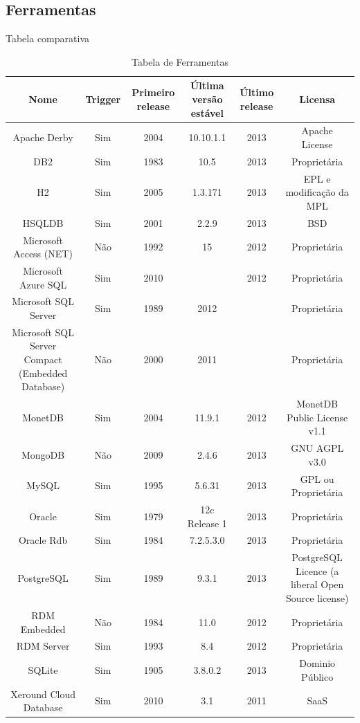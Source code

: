 \documentclass[conference]{IEEEtran}
\begin{document}
  \subsection{Ferramentas}
  Tabela comparativa
  \begin{table}[!t]
    \renewcommand{\arraystretch}{1}
    \caption{Tabela de Ferramentas}
    \label{table_example}
    \centering
    \begin{tabular}{ c  c  c  c  c  c }
      \hline
      \bfseries Nome & \bfseries Trigger & \bfseries Primeiro release & \bfseries Última versão estável & \bfseries Último release & \bfseries Licensa \\
      \hline
      Apache Derby & Sim & 2004 & 10.10.1.1 & 2013 & Apache License \\
      \hline
      DB2 & Sim & 1983 & 10.5 & 2013 & Proprietária \\
      \hline
      H2 & Sim & 2005 & 1.3.171 & 2013 & EPL e modificação da MPL \\
      \hline
      HSQLDB & Sim & 2001 & 2.2.9 & 2013 & BSD \\
      \hline
      Microsoft Access (NET) & Não & 1992 & 15 & 2012 & Proprietária \\
      \hline
      Microsoft Azure SQL & Sim & 2010 & & 2012 & Proprietária \\
      \hline
      Microsoft SQL Server & Sim & 1989 & 2012 &  &  Proprietária \\
      \hline
      Microsoft SQL Server Compact (Embedded Database) & Não & 2000 & 2011 & & Proprietária \\
      \hline
      MonetDB & Sim & 2004 & 11.9.1 & 2012 & MonetDB Public License v1.1 \\
      \hline
      MongoDB & Não & 2009 & 2.4.6 & 2013 & GNU AGPL v3.0 \\
      \hline
      MySQL & Sim & 1995 & 5.6.31 & 2013 & GPL ou Proprietária\\
      \hline
      Oracle & Sim & 1979 & 12c Release 1 & 2013 & Proprietária\\
      \hline
      Oracle Rdb  & Sim & 1984 & 7.2.5.3.0 & 2013 & Proprietária\\
      \hline
      PostgreSQL & Sim & 1989 & 9.3.1 & 2013 & PostgreSQL Licence (a liberal Open Source license) \\
      \hline
      RDM Embedded & Não & 1984 & 11.0 & 2012 & Proprietária \\
      \hline
      RDM Server & Sim & 1993 & 8.4 & 2012 & Proprietária \\
      \hline
      SQLite & Sim & 1905 & 3.8.0.2 & 2013 & Dominio Público \\
      \hline
      Xeround Cloud Database & Sim & 2010 & 3.1 & 2011 & SaaS \\
      \hline
    \end{tabular}
  \end{table}
\end{document}
